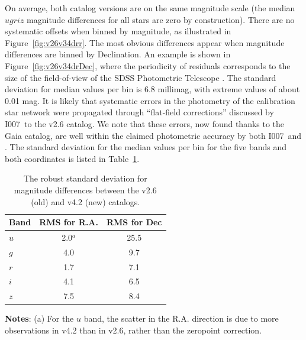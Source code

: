 \documentclass[fleqn,usenatbib]{mnras}
\newcommand{\pO}{\hbox{I007}}
\begin{document}
On average, both catalog versions are on the same magnitude scale (the median $ugriz$ 
magnitude differences for all stars are zero by construction). There are no systematic offsets 
when binned by magnitude, as illustrated in Figure~\ref{fig:v26v34drr}. The most obvious 
differences appear when magnitude differences are binned by Declination. An example is 
shown in Figure~\ref{fig:v26v34drDec}, where the periodicity of residuals corresponds to the 
size of the field-of-view of the SDSS Photometric Telescope \citep{2006AN....327..821T}. 
The standard deviation for median values per bin is 6.8 millimag, with extreme values of about 
0.01 mag. It is likely that systematic errors in the photometry of the calibration star network  
were propagated through ``flat-field corrections'' discussed by \pO\ to the v2.6 catalog.
We note that these errors, now found thanks to the Gaia catalog, are well within the claimed
photometric accuracy by both \pO\ and \cite{2002AJ....123.2121S}. The standard deviation 
for the median values per bin for the five bands and both coordinates is listed in Table~\ref{tab:oldnewRMS}. 
   
\begin{table}
	\centering
	\caption{The robust standard deviation for magnitude differences between the v2.6 (old) and v4.2 (new) catalogs.}
	\label{tab:oldnewRMS}
	\begin{tabular}{l|c|c} %
		\hline
		Band & RMS for R.A. & RMS for Dec \\
		\hline
        
       $u$        &        2.0$^a$    &    25.5      \\
       $g$        &        4.0    &      9.7      \\  
       $r$         &        1.7    &      7.1      \\  
       $i$         &        4.1    &      6.5      \\ 
       $z$        &        7.5    &      8.4      \\ 
		\hline
	\end{tabular}
     \vspace{1ex}

     {\raggedright {\bf Notes}: (a) For the $u$ band, the scatter in the R.A. direction is due to more observations in v4.2 than in v2.6, rather than the zeropoint correction. \par}
\end{table}
\end{document}
